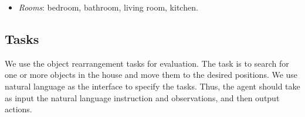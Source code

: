 \begin{itemize}
{                     magazine,
                     milk,
                     milkshake,
                     minced meat,
                     mouse,
                     mug,
                     notes,
                     oven tray,
                     pancake,
                     paper,
                     pear,
                     pie,
                     pillow,
                     plate,
                     plum,
                     poundcake,
                     pudding,
                     radio,
                     remote control,
                     salad,
                     salmon,
                     slippers,
                     sports ball,
                     sundae,
                     teddybear,
                     toilet paper,
                     toothbrush,
                     toothpaste,
                     towel,
                     towel rack,
                     toy,
                     washing sponge,
                     water glass,
                     whipped cream,
                     wine,
                     wineglass}
    \item \textit{Rooms}: bedroom, bathroom, living room, kitchen.
\end{itemize}




\subsection{Tasks}
We use the object rearrangement tasks for evaluation. The task is to search for one or more objects in the house and move them to the desired positions. We use natural language as the interface to specify the tasks. Thus, the agent should take as input the natural language instruction and observations, and then output actions. 


